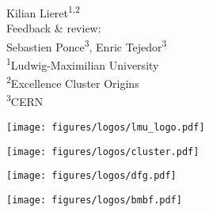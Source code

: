 \begin{frame}{}
	\begin{center}
		{
			{
				\Large \inserttitle
			}\\[0.7ex]
			{
				\large \insertsubtitle
			}
		}\\[2ex]
	   Kilian Lieret\textsuperscript{1,2}\\[2ex]
	   {
	   	\small
	   	Feedback \& review:\\[0ex]
	   	Sebastien Ponce\textsuperscript{3},
	   	Enric Tejedor\textsuperscript{3}
	   }
	   \\[2.5 ex]
	   {
	   	\footnotesize
	   	\textsuperscript{1}Ludwig-Maximilian University\\%
	   	\textsuperscript{2}Excellence Cluster Origins\\%
	   	\vspace{-0.5ex}\textsuperscript{3}CERN
	   }\\[2.5ex]

		\insertdate
	\end{center}
	\vspace{6ex}
	\centering
	\newcommand\tmp{2.6cm}
	\newcommand\tmpp{2.4cm}
	\begin{changemargin}{-1cm}{-1cm}
	\centering
	{
		\begin{minipage}{\tmp}
		\texttt{[image: figures/logos/lmu\_logo.pdf]}
		\end{minipage}
	}
	{
		\begin{minipage}{\tmp}
			\texttt{[image: figures/logos/cluster.pdf]}
		\end{minipage}
	}%
	{
		\begin{minipage}{\tmp}
			\texttt{[image: figures/logos/dfg.pdf]}
		\end{minipage}
	}
	{
		\begin{minipage}{\tmp}
			\texttt{[image: figures/logos/bmbf.pdf]}
		\end{minipage}
	}
	\end{changemargin}
\end{frame}